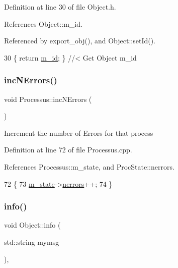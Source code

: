 Definition at line 30 of file Object.\+h.



References Object\+::m\+\_\+id.



Referenced by export\+\_\+obj(), and Object\+::set\+Id().


\begin{DoxyCode}
30 \{ \textcolor{keywordflow}{return} \hyperlink{classObject_aca74b9dbfed7b5556ea2d56c65b6b6b0}{m\_id};         \} \textcolor{comment}{//< Get Object m\_id }
\end{DoxyCode}
\mbox{\label{classProcessus_abe603d0636f76db6aa6c5c60cf34c591}} 
\subsubsection{\texorpdfstring{inc\+N\+Errors()}{incNErrors()}}
{\footnotesize\ttfamily void Processus\+::inc\+N\+Errors (\begin{DoxyParamCaption}{ }\end{DoxyParamCaption})\hspace{0.3cm}{\ttfamily [inherited]}}

Increment the number of Errors for that process 

Definition at line 72 of file Processus.\+cpp.



References Processus\+::m\+\_\+state, and Proc\+State\+::nerrors.


\begin{DoxyCode}
72                            \{
73   \hyperlink{classProcessus_ab3539eee42891ceae0baf4395ae7fb61}{m\_state}->\hyperlink{structProcState_a51a0f54ba62b07e07ac8518c5f32828d}{nerrors}++;
74 \}
\end{DoxyCode}
\mbox{\label{classObject_a644fd329ea4cb85f54fa6846484b84a8}} 
\subsubsection{\texorpdfstring{info()}{info()}\hspace{0.1cm}{\footnotesize\ttfamily [1/2]}}
{\footnotesize\ttfamily void Object\+::info (\begin{DoxyParamCaption}\item[{std\+::string}]{mymsg }\end{DoxyParamCaption})\hspace{0.3cm}{\ttfamily [inline]}, {\ttfamily [inherited]}}



